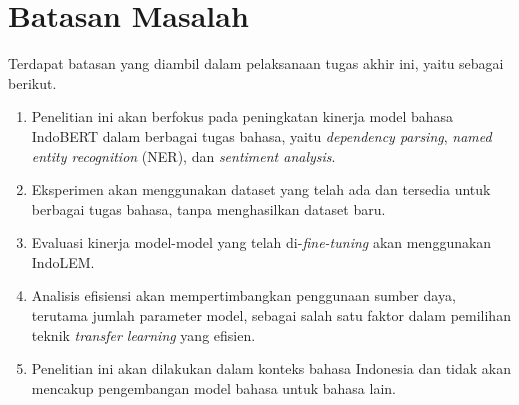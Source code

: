 \section{Batasan Masalah}
\label{sec:batasan-masalah}

Terdapat batasan yang diambil dalam pelaksanaan tugas akhir ini, yaitu sebagai berikut.

\begin{enumerate}
    \item Penelitian ini akan berfokus pada peningkatan kinerja model bahasa IndoBERT dalam berbagai tugas bahasa, yaitu \textit{dependency parsing},  \textit{named entity recognition} (NER), dan \textit{sentiment analysis}.
    \item Eksperimen akan menggunakan dataset yang telah ada dan tersedia untuk berbagai tugas bahasa, tanpa menghasilkan dataset baru.
    \item Evaluasi kinerja model-model yang telah di-\textit{fine-tuning} akan menggunakan IndoLEM.
    \item Analisis efisiensi akan mempertimbangkan penggunaan sumber daya, terutama jumlah parameter model, sebagai salah satu faktor dalam pemilihan teknik \textit{transfer learning} yang efisien.
    \item Penelitian ini akan dilakukan dalam konteks bahasa Indonesia dan tidak akan mencakup pengembangan model bahasa untuk bahasa lain.
\end{enumerate}
